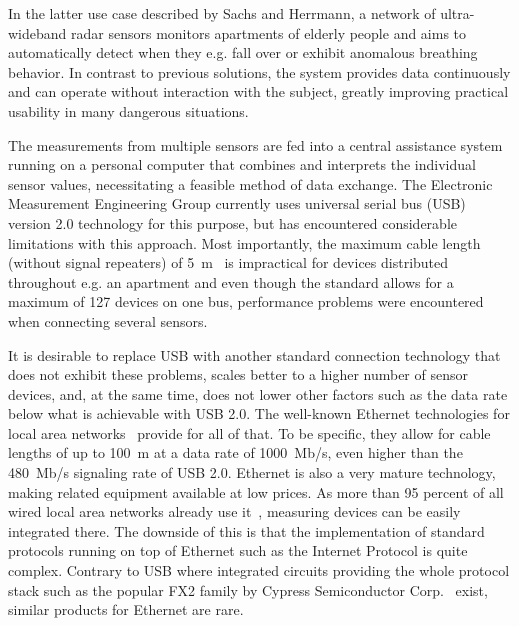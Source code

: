 \documentclass[a4paper, 11pt, oneside]{Thesis}  %
\begin{document}
In the latter use case described by Sachs and Herrmann, a network of ultra-wideband radar sensors monitors apartments of elderly people and aims to automatically detect when they e.g. fall over or exhibit anomalous breathing behavior. In contrast to previous solutions, the system provides data continuously and can operate without interaction with the subject, greatly improving practical usability in many dangerous situations.

The measurements from multiple sensors are fed into a central assistance system running on a personal computer that combines and interprets the individual sensor values, necessitating a feasible method of data exchange. The Electronic Measurement Engineering Group currently uses universal serial bus (USB) version 2.0 technology for this purpose, but has encountered considerable limitations with this approach. Most importantly, the maximum cable length (without signal repeaters) of 5~m~\cite{USBSpec} is impractical for devices distributed throughout e.g. an apartment and even though the standard allows for a maximum of 127 devices on one bus, performance problems were encountered when connecting several sensors.

It is desirable to replace USB with another standard connection technology that does not exhibit these problems, scales better to a higher number of sensor devices, and, at the same time, does not lower other factors such as the data rate below what is achievable with USB 2.0. The well-known Ethernet technologies for local area networks~\cite{Ethernet} provide for all of that. To be specific, they allow for cable lengths of up to 100~m at a data rate of 1000~Mb/s, even higher than the 480~Mb/s signaling rate of USB 2.0. Ethernet is also a very mature technology, making related equipment available at low prices. As more than 95 percent of all wired local area networks already use it~\cite{heiseEthernet}, measuring devices can be easily integrated there. The downside of this is that the implementation of standard protocols running on top of Ethernet such as the Internet Protocol is quite complex. Contrary to USB where integrated circuits providing the whole protocol stack such as the popular FX2 family by Cypress Semiconductor Corp.~\cite{CypressFX2} exist, similar products for Ethernet are rare.
\end{document}
